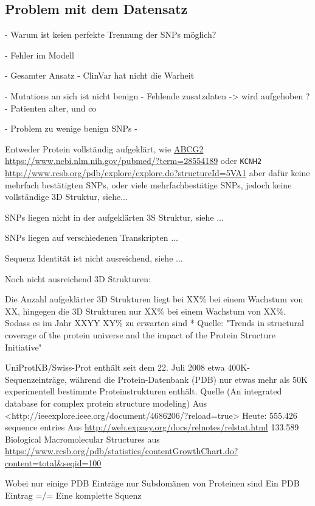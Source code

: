 


\subsection{Problem mit dem Datensatz}
- Warum ist keien perfekte Trennung der SNPs möglich?

- Fehler im Modell

- Gesamter Ansatz
- ClinVar hat nicht die Warheit

- Mutations an sich ist nicht benign
- Fehlende zusatzdaten -> wird aufgehoben ?
- Patienten alter, und co

- Problem zu wenige benign SNPs
- 


Entweder Protein vollständig aufgeklärt, wie \url{ABCG2} \url{https://www.ncbi.nlm.nih.gov/pubmed/?term=28554189} oder \texttt{KCNH2} \url{http://www.rcsb.org/pdb/explore/explore.do?structureId=5VA1} aber dafür keine mehrfach bestätigten SNPs, oder viele mehrfachbestätige SNPs, jedoch keine vollständige 3D Struktur, siehe...

SNPs liegen nicht in der aufgeklärten 3S Struktur, siehe ...

SNPs liegen auf verschiedenen Transkripten ...

Sequenz Identität ist nicht ausreichend, siehe ...

Noch nicht ausreichend 3D Strukturen:

Die Anzahl aufgeklärter 3D Strukturen liegt bei XX\% bei einem Wachstum von XX, hingegen die 3D Strukturen nur XX\% bei einem Wachstum von XX\%. Sodass es im Jahr XXYY XY\% zu erwarten sind * Quelle: "Trends in structural coverage of the protein universe and the impact of the Protein Structure Initiative"


UniProtKB/Swiss-Prot enthält seit dem 22. Juli 2008 etwa 400K-Sequenzeinträge, während die Protein-Datenbank (PDB) nur etwas mehr als 50K experimentell bestimmte Proteinstrukturen enthält. 
Quelle (An integrated database for complex protein structure modeling) Aus <http://ieeexplore.ieee.org/document/4686206/?reload=true> 
Heute:  
555.426 sequence entries Aus \url{http://web.expasy.org/docs/relnotes/relstat.html} 
133.589 Biological Macromolecular Structures aus \url{https://www.rcsb.org/pdb/statistics/contentGrowthChart.do?content=total&seqid=100}

Wobei nur einige PDB Einträge nur Subdomänen von Proteinen sind
Ein PDB Eintrag =/= Eine komplette Squenz

